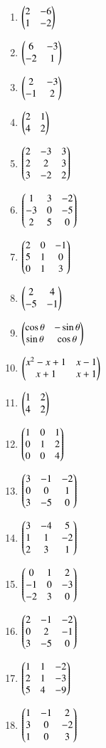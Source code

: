 \begin{multicols}{2}
\begin{enumerate}[label=\thesubsection.\arabic*,ref=\thesubsection.\theenumi]
\item $\begin{pmatrix}2 & -6 \\ 1 & -2\end{pmatrix}$
\item $\begin{pmatrix}6 & -3 \\ -2 & 1\end{pmatrix}$
\item $\begin{pmatrix}2 & -3 \\ -1 & 2\end{pmatrix}$
\item $\begin{pmatrix}2 & 1 \\ 4 & 2\end{pmatrix}$
\item $\begin{pmatrix}2 & -3 & 3 \\ 2 & 2 & 3 \\ 3 & -2 & 2\end{pmatrix}$
\item $\begin{pmatrix}1 & 3 & -2 \\ -3 & 0 & -5 \\ 2 & 5 & 0\end{pmatrix}$  
\item $\begin{pmatrix}2 & 0 & -1 \\ 5 & 1 & 0 \\ 0 & 1 & 3\end{pmatrix}$ 
\item $\begin{pmatrix}2 & 4 \\ -5 & -1\end{pmatrix}$ 
\item $\begin{pmatrix}\cos \theta  &  -\sin \theta \\ \sin \theta & \cos \theta\end{pmatrix}$
\item $\begin{pmatrix}x^2-x+1 & x-1 \\ x+1 & x+1\end{pmatrix}$ 
\item $\begin{pmatrix}1 & 2 \\ 4 & 2\end{pmatrix}$
\item $\begin{pmatrix}1 & 0 & 1 \\ 0 & 1 & 2 \\ 0 & 0 & 4\end{pmatrix}$
\item $\begin{pmatrix}3 & -1 & -2 \\ 0 & 0 & 1 \\ 3 & -5 & 0\end{pmatrix}$
\item $\begin{pmatrix}3 & -4 & 5 \\ 1 & 1 & -2 \\ 2 & 3 & 1\end{pmatrix}$
\item $\begin{pmatrix}0 & 1 & 2 \\ -1 & 0 & -3 \\ -2 & 3 & 0\end{pmatrix}$
\item $\begin{pmatrix}2 & -1 & -2 \\ 0 & 2 & -1 \\ 3 & -5 & 0\end{pmatrix}$
\item $\begin{pmatrix}1 & 1 & -2 \\ 2 & 1 & -3 \\ 5 & 4 & -9\end{pmatrix}$
\item $\begin{pmatrix}1 & -1 & 2 \\ 3 & 0 & -2 \\ 1 & 0 & 3\end{pmatrix}$ \label{prob:4}

\end{enumerate}
\end{multicols}
